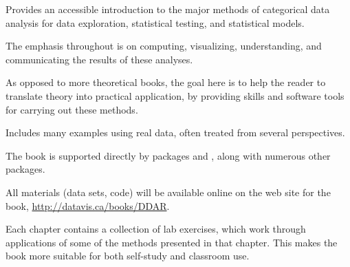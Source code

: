 \begin{itemize*}
	\item Provides an accessible introduction to the major methods of categorical data analysis
    for data exploration, statistical testing, and statistical models.
	\item The emphasis throughout is on computing, visualizing, understanding, and communicating
	  the results of these analyses.
  \item As opposed to more theoretical books, the goal here is to
    help the reader to translate theory into practical application, by providing skills and
    software tools for carrying out these methods.
	\item Includes many examples using real data, often treated from several perspectives.
	\item The book is supported directly by \R packages  and , along with numerous other \R packages.
	\item All materials (data sets, \R code) will be available online on the web site for the book, \url{http://datavis.ca/books/DDAR}.
  \item Each chapter contains a collection of lab exercises, which work through
    applications of some of the methods presented in that chapter.  This makes the book more suitable
    for both self-study and classroom use.
\end{itemize*}

